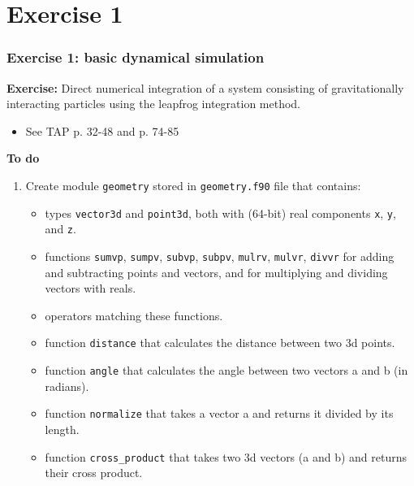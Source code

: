 
\subtitle{Course exercise 1: basic dynamical simulation}



\begin{frame}
  \titlepage
\end{frame}

\section{Exercise 1}

\begin{frame}
  \frametitle{Exercise 1: basic dynamical simulation}

  \textbf{Exercise:} Direct numerical integration of a system consisting of gravitationally interacting particles using the leapfrog integration method.
  \begin{itemize}
   \item See TAP p. 32-48 and p. 74-85
  \end{itemize}


  \textbf{To do}
  \begin{enumerate}
   \item Create module \texttt{geometry} stored in \texttt{geometry.f90} file that contains:
   \begin{itemize}
    \item types \texttt{vector3d} and \texttt{point3d}, both with (64-bit) real components \texttt{x}, \texttt{y}, and \texttt{z}.
    \item functions \texttt{sumvp}, \texttt{sumpv}, \texttt{subvp}, \texttt{subpv}, \texttt{mulrv}, \texttt{mulvr}, \texttt{divvr} for adding and subtracting points and vectors, and for multiplying and dividing vectors with reals.
    \item operators matching these functions.
    \item function \texttt{distance} that calculates the distance between two 3d points.
    \item function \texttt{angle} that calculates the angle between two vectors a and b (in radians).
    \item function \texttt{normalize} that takes a vector a and returns it divided by its length.
    \item function \texttt{cross\_product} that takes two 3d vectors (a and b) and returns their cross product.
   \end{itemize}
  \end{enumerate}
\end{frame}



